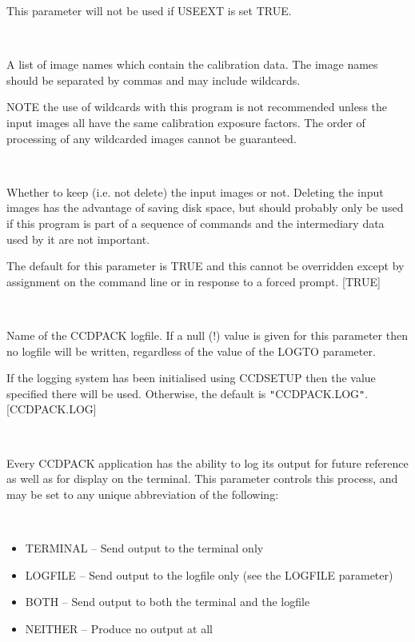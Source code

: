\documentclass[twoside,11pt]{article}
\newcommand{\htmlref}[2]{#1}
\renewcommand{\_}{\texttt{\symbol{95}}}
\newcommand{\qt}[1]{{\tt "}#1{\tt "}}
\newcommand{\xroutine}[1]{\htmlref{{\sc #1}}{#1}}
\newcommand{\sstsubsection}[1]{ \item[{#1}] \mbox{} \\}
\newcommand{\sstitemlist}[1]{
  \mbox{} \\
  \vspace{-3.5ex}
  \begin{itemize}
     #1
  \end{itemize}
}
\newcommand{\sstitem}{\item}
\newcommand{\sstsubsection}[1]{\item[{#1}]}
\newcommand{\sstitemlist}[1]{
      \begin{itemize}
         #1
      \end{itemize}
      \\
   }
\newcommand{\sstitem}{\item}
\begin{document}
{{{         This parameter will not be used if USEEXT is set TRUE.
      }
      \sstsubsection{
         IN = LITERAL (Read)
      } {
         A list of image names which contain the calibration data. The
         image names should be separated by commas and may include
         wildcards.

         NOTE the use of wildcards with this program is not recommended
         unless the input images all have the same calibration exposure
         factors. The order of processing of any wildcarded images cannot
         be guaranteed.
      }
      \sstsubsection{
         KEEPIN = \_LOGICAL (Read)
      } {
         Whether to keep (i.e. not delete) the input images or
         not. Deleting the input images has the advantage of saving disk
         space, but should probably only be used if this program is part
         of a sequence of commands and the intermediary data used by
         it are not important.

         The default for this parameter is TRUE and this cannot be
         overridden except by assignment on the command line or in
         response to a forced prompt.
         [TRUE]
      }
      \sstsubsection{
         LOGFILE = FILENAME (Read)
      } {
         Name of the CCDPACK logfile.  If a null (!) value is given for
         this parameter then no logfile will be written, regardless of
         the value of the LOGTO parameter.

         If the logging system has been initialised using \xroutine{CCDSETUP}
         then the value specified there will be used. Otherwise, the
         default is \qt{CCDPACK.LOG}.
         [CCDPACK.LOG]
      }
      \sstsubsection{
         LOGTO = LITERAL (Read)
      } {
         Every CCDPACK application has the ability to log its output
         for future reference as well as for display on the terminal.
         This parameter controls this process, and may be set to any
         unique abbreviation of the following:
         \sstitemlist{

            \sstitem
               TERMINAL  -- Send output to the terminal only

            \sstitem
               LOGFILE   -- Send output to the logfile only (see the
                               LOGFILE parameter)

            \sstitem
               BOTH      -- Send output to both the terminal and the
                               logfile

            \sstitem
               NEITHER   -- Produce no output at all

}}}}
\end{document}
